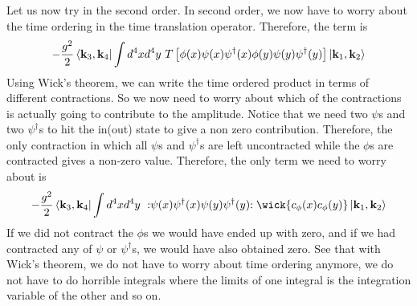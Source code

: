 \documentclass[11pt, notitlepage]{report}
\newcommand{\normord}[1]{:\mathrel{#1}:}
\renewcommand{\c}[1]{c_\mathbf{#1}}
\numberwithin{equation}{section}
\begin{document}
    Let us now try in the second order. In second order, we now have to worry about the time ordering in the time translation operator. Therefore, the term is 
    \begin{equation*}
        -\frac{g^2}{2} \bra{\textbf{k}_3, \textbf{k}_4} \int d^4x d^4y ~T\left[  \phi(x) \psi(x) \psi^\dagger(x)  \phi(y) \psi(y) \psi^\dagger(y)  \right]\ket{\textbf{k}_1, \textbf{k}_2}
    \end{equation*}
    Using Wick's theorem, we can write the time ordered product in terms of different contractions. So we now need to worry about which of the contractions is actually going to contribute to the amplitude. Notice that we need two \(\psi\)s and two \(\psi^\dagger\)s to hit the in(out) state to give a non zero contribution. Therefore, the only contraction in which all \(\psi\)s and \(\psi^\dagger\)s are left uncontracted while the \(\phi\)s are contracted gives a non-zero value. Therefore, the only term we need to worry about is 
    \begin{equation*}
        -\frac{g^2}{2} \bra{\textbf{k}_3, \textbf{k}_4} \int d^4x d^4y~    \normord{\psi(x) \psi^\dagger(x) \psi(y) \psi^\dagger(y)} \wick{\c\phi(x)\c\phi(y)}   \ket{\textbf{k}_1, \textbf{k}_2}
    \end{equation*}
    If we did not contract the \(\phi\)s we would have ended up with zero, and if we had contracted any of \(\psi\) or \(\psi^\dagger\)s, we would have also obtained zero. See that with Wick's theorem, we do not have to worry about time ordering anymore, we do not have to do horrible integrals where the limits of one integral is the integration variable of the other and so on.  \\
\end{document}
